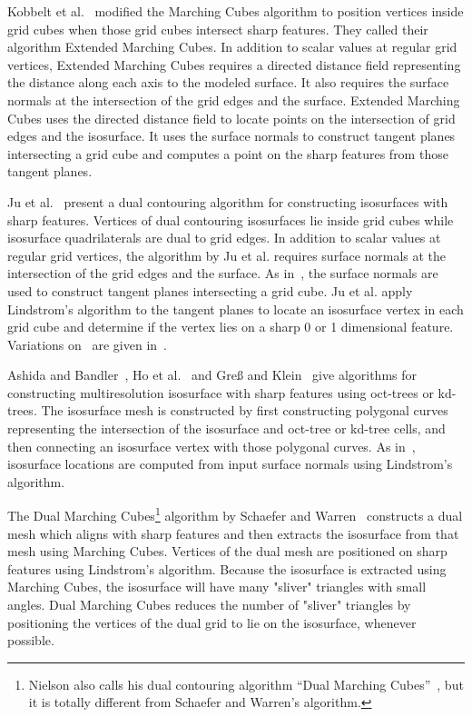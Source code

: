 Kobbelt et al.~\cite{kbsh-fssev-01} modified the Marching Cubes algorithm
to position vertices inside grid cubes when those grid cubes
intersect sharp features.
They called their algorithm Extended Marching Cubes.
In addition to scalar values at regular grid vertices,
Extended Marching Cubes requires a directed distance field
representing the distance along each axis to the modeled surface.
It also requires the surface normals
at the intersection of the grid edges and the surface.
Extended Marching Cubes uses the directed distance field
to locate points on the intersection of grid edges and the isosurface.
It uses the surface normals to construct tangent planes
intersecting a grid cube and computes a point on the sharp features
from those tangent planes.

Ju et al.~\cite{jlsw-dchd-02,sw-dcss-02} present a dual contouring algorithm
for constructing isosurfaces with sharp features.
Vertices of dual contouring isosurfaces lie inside grid cubes
while isosurface quadrilaterals are dual to grid edges.
In addition to scalar values at regular grid vertices,
the algorithm by Ju et al. requires surface normals
at the intersection of the grid edges and the surface.
As in~\cite{kbsh-fssev-01},
the surface normals are used to construct tangent planes
intersecting a grid cube.
Ju et al. apply Lindstrom's algorithm to the tangent planes
to locate an isosurface vertex in each grid cube
and determine if the vertex lies on a sharp 0 or 1 dimensional feature.
Variations on~\cite{jlsw-dchd-02} are given 
in~\cite{zhk-dctps-04,Varadhan:2003:fss}.

Ashida and Bandler~\cite{ab-fpmmo-03}, Ho et al.~\cite{hwco-cmsaf-05}
and Gre{\ss} and Klein~\cite{gk-eretm-04} give algorithms
for constructing multiresolution isosurface with sharp features
using oct-trees or kd-trees.
The isosurface mesh is constructed
by first constructing polygonal curves representing the intersection
of the isosurface and oct-tree or kd-tree cells,
and then connecting an isosurface vertex with those polygonal curves.
As in~\cite{jlsw-dchd-02},
isosurface locations are computed from input surface normals
using Lindstrom's algorithm.

The Dual Marching Cubes\footnote{Nielson also calls his
dual contouring algorithm ``Dual Marching Cubes''~\cite{n-dmc-04},
but it is totally different from Schaefer and Warren's algorithm.}
algorithm by Schaefer and Warren~\cite{sw-dmcpc-04}
constructs a dual mesh which aligns with sharp features
and then extracts the isosurface from that mesh 
using Marching Cubes.
Vertices of the dual mesh are positioned on sharp features
using Lindstrom's algorithm.
Because the isosurface is extracted using Marching Cubes,
the isosurface will have many "sliver" triangles with small angles.
Dual Marching Cubes reduces the number of "sliver" triangles
by positioning the vertices of the dual grid to lie on the isosurface,
whenever possible.


